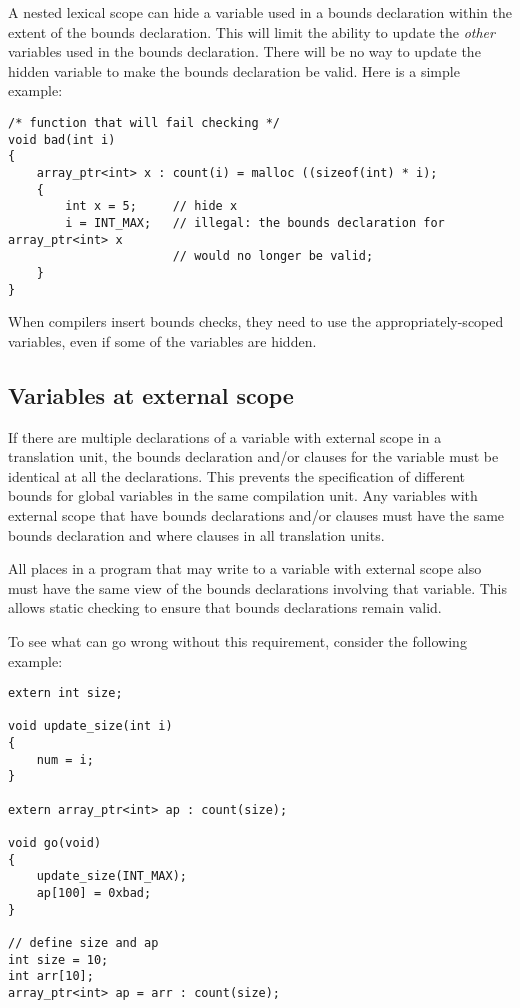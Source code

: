 A nested lexical scope can hide a variable used in a bounds declaration
within the extent of the bounds declaration. This will limit the ability
to update the {\it other} variables used in the bounds declaration.  There will be
no way to update the hidden variable to make the bounds declaration be valid.
Here is a simple example:
\begin{verbatim}
/* function that will fail checking */
void bad(int i)
{
    array_ptr<int> x : count(i) = malloc ((sizeof(int) * i);
    {
        int x = 5;     // hide x
        i = INT_MAX;   // illegal: the bounds declaration for array_ptr<int> x
                       // would no longer be valid;
    }
}
\end{verbatim}
When compilers insert bounds checks, they need to use the appropriately-scoped
variables, even if some of the variables are hidden.

\subsection{Variables at external scope}
\label{section:external-scope-variables}

If there are multiple declarations of a variable with external scope in
a translation unit, the bounds declaration and/or  clauses for the
variable must be identical at all the declarations. This prevents the
specification of different bounds for global variables in the same
compilation unit. Any variables with external scope that have bounds
declarations and/or  clauses must have the same bounds declaration
and where clauses in all translation units.

All places in a program that may write to a variable with external scope
also must have the same view of the bounds declarations involving that
variable. This allows static checking to ensure that bounds declarations
remain valid.

To see what can go wrong without this requirement, consider the
following example:

\begin{verbatim}
extern int size;

void update_size(int i)
{
    num = i;
}

extern array_ptr<int> ap : count(size);

void go(void)
{
    update_size(INT_MAX);
    ap[100] = 0xbad;
}

// define size and ap
int size = 10;
int arr[10];
array_ptr<int> ap = arr : count(size);
\end{verbatim}

